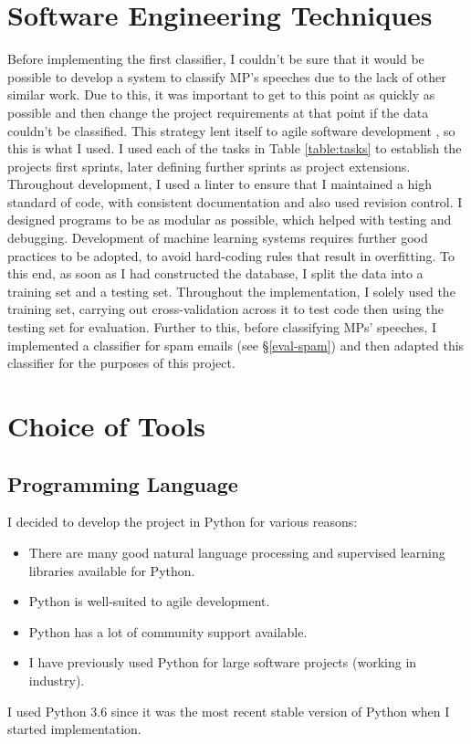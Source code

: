 \documentclass[12pt,a4paper,twoside,openright]{report}
\begin{document}
\section{Software Engineering Techniques} \label{prep-sweng}
	
Before implementing the first classifier, I couldn't be sure that it would be possible to develop a system to classify MP's speeches due to the lack of other similar work. Due to this, it was important to get to this point as quickly as possible and then change the project requirements at that point if the data couldn't be classified. This strategy lent itself to agile software development \cite{agile}, so this is what I used. I used each of the tasks in Table \ref{table:tasks} to establish the projects first sprints, later defining further sprints as project extensions.
\newline
\newline
Throughout development, I used a linter to ensure that I maintained a high standard of code, with consistent documentation and also used revision control. I designed programs to be as modular as possible, which helped with testing and debugging.
\newline
\newline
Development of machine learning systems requires further good practices to be adopted, to avoid hard-coding rules that result in overfitting. To this end, as soon as I had constructed the database, I split the data into a training set and a testing set. Throughout the implementation, I solely used the training set, carrying out cross-validation across it to test code then using the testing set for evaluation. Further to this, before classifying MPs' speeches, I implemented a classifier for spam emails (see \S\ref{eval-spam}) and then adapted this classifier for the purposes of this project.


\section{Choice of Tools} \label{prep-tools}

\subsection{Programming Language}

I decided to develop the project in Python for various reasons:
\begin{itemize}
	\item There are many good natural language processing and supervised learning libraries available for Python.
	\item Python is well-suited to agile development.
	\item Python has a lot of community support available.
	\item I have previously used Python for large software projects (working in industry).
\end{itemize}
I used Python 3.6 since it was the most recent stable version of Python when I started implementation.
\end{document}
